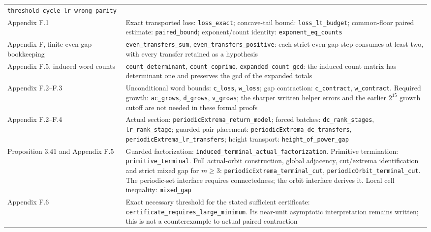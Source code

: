\documentclass[12pt]{article}
\begin{document}
\begin{longtable}[]{@{}
  >{\raggedright\arraybackslash}p{}
  >{\raggedright\arraybackslash}p{}@{}}
\texttt{\nolinkurl{threshold_cycle_lr_wrong_parity}} \\
Appendix F.1 & Exact transported loss: \texttt{\nolinkurl{loss_exact}};
concave-tail bound: \texttt{\nolinkurl{loss_lt_budget}}; common-floor
paired estimate: \texttt{\nolinkurl{paired_bound}}; exponent/count
identity: \texttt{\nolinkurl{exponent_eq_counts}} \\
Appendix F, finite even-gap bookkeeping &
\texttt{\nolinkurl{even_transfers_sum}},
\texttt{\nolinkurl{even_transfers_positive}}: each strict even-gap step
consumes at least two, with every transfer retained as a hypothesis \\
Appendix F.5, induced word counts &
\texttt{\nolinkurl{count_determinant}},
\texttt{\nolinkurl{count_coprime}},
\texttt{\nolinkurl{expanded_count_gcd}}: the induced count matrix has
determinant one and preserves the gcd of the expanded totals \\
Appendix F.2--F.3 & Unconditional word bounds:
\texttt{\nolinkurl{c_loss}}, \texttt{\nolinkurl{w_loss}}; gap
contraction: \texttt{\nolinkurl{c_contract}},
\texttt{\nolinkurl{w_contract}}. Required growth:
\texttt{\nolinkurl{ac_grows}}, \texttt{\nolinkurl{d_grows}},
\texttt{\nolinkurl{v_grows}}; the sharper written helper errors and the
earlier \(2^{15}\) growth cutoff are not needed in these formal
proofs \\
Appendix F.2--F.4 & Actual section:
\texttt{\nolinkurl{periodicExtrema_return_model}}; forced batches:
\texttt{\nolinkurl{dc_rank_stages}}, \texttt{\nolinkurl{lr_rank_stage}};
guarded pair placement:
\texttt{\nolinkurl{periodicExtrema_dc_transfers}},
\texttt{\nolinkurl{periodicExtrema_lr_transfers}}; height transport:
\texttt{\nolinkurl{height_of_power_gap}} \\
Proposition 3.41 and Appendix F.5 & Guarded factorization:
\texttt{\nolinkurl{induced_terminal_actual_factorization}}. Primitive
termination: \texttt{\nolinkurl{primitive_terminal}}. Full actual-orbit
construction, global adjacency, cut/extrema identification and strict
mixed gap for \(m\ge3\):
\texttt{\nolinkurl{periodicExtrema_terminal_cut}},
\texttt{\nolinkurl{periodicOrbit_terminal_cut}}. The periodic-set
interface requires connectedness; the orbit interface derives it. Local
cell inequality: \texttt{\nolinkurl{mixed_gap}} \\
Appendix F.6 & Exact necessary threshold for the stated sufficient
certificate: \texttt{\nolinkurl{certificate_requires_large_minimum}}.
Its near-unit asymptotic interpretation remains written; this is not a
counterexample to actual paired contraction \\

\end{longtable}
\end{document}
